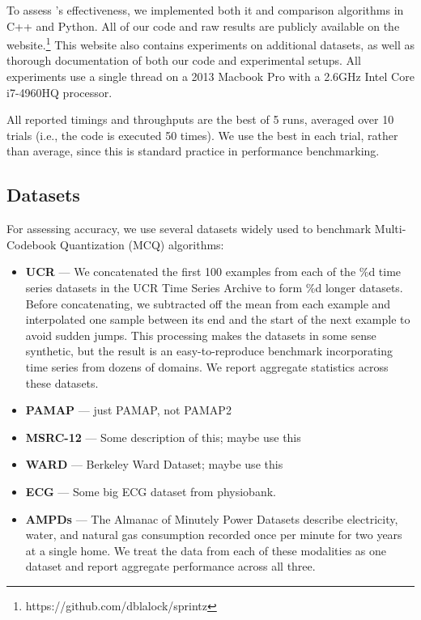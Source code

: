 
To assess \mine's effectiveness, we implemented both it and comparison algorithms in C++ and Python. All of our code and raw results are publicly available on the \mine website.\footnote{https://github.com/dblalock/sprintz} This website also contains experiments on additional datasets, as well as thorough documentation of both our code and experimental setups. All experiments use a single thread on a 2013 Macbook Pro with a 2.6GHz Intel Core i7-4960HQ processor.

All reported timings and throughputs are the best of 5 runs, averaged over 10 trials (i.e., the code is executed 50 times). We use the best in each trial, rather than average, since this is standard practice in performance benchmarking.

\subsection{Datasets}

For assessing accuracy, we use several datasets widely used to benchmark Multi-Codebook Quantization (MCQ) algorithms:
\begin{itemize}[leftmargin=4mm]
\item \textbf{UCR} \cite{ucrTimeSeries} --- We concatenated the first 100 examples from each of the \%d time series datasets in the UCR Time Series Archive \cite{ucrTimeSeries} to form \%d longer datasets. Before concatenating, we subtracted off the mean from each example and interpolated one sample between its end and the start of the next example to avoid sudden jumps. This processing makes the datasets in some sense synthetic, but the result is an easy-to-reproduce benchmark incorporating time series from dozens of domains. We report aggregate statistics across these datasets.
\item \textbf{PAMAP} \cite{pamap} --- just PAMAP, not PAMAP2
\item \textbf{MSRC-12} \cite{msrc} --- Some description of this; maybe use this
\item \textbf{WARD} \cite{ward} --- Berkeley Ward Dataset; maybe use this
\item \textbf{ECG} \cite{physiobank} --- Some big ECG dataset from physiobank.
\item \textbf{AMPDs} \cite{ampds} --- The Almanac of Minutely Power Datasets describe electricity, water, and natural gas consumption recorded once per minute for two years at a single home. We treat the data from each of these modalities as one dataset and report aggregate performance across all three.
\end{itemize}

